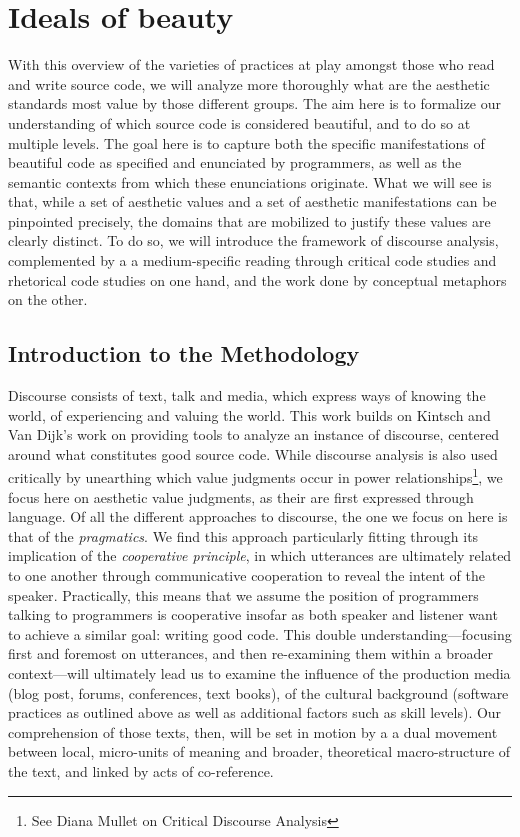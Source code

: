 \pagebreak

\section{Ideals of beauty} %

With this overview of the varieties of practices at play amongst those who read and write source code, we will analyze more thoroughly what are the aesthetic standards most value by those different groups. The aim here is to formalize our understanding of which source code is considered beautiful, and to do so at multiple levels. The goal here is to capture both the specific manifestations of beautiful code as specified and enunciated by programmers, as well as the semantic contexts from which these enunciations originate. What we will see is that, while a set of aesthetic values and a set of aesthetic manifestations can be pinpointed precisely, the domains that are mobilized to justify these values are clearly distinct. To do so, we will introduce the framework of discourse analysis, complemented by a a medium-specific reading through critical code studies and rhetorical code studies on one hand, and the work done by conceptual metaphors on the other.

\subsection{Introduction to the Methodology} %

Discourse consists of text, talk and media, which express ways of knowing the world, of experiencing and valuing the world. This work builds on Kintsch and Van Dijk's work on providing tools to analyze an instance of discourse, centered around what constitutes good source code. While discourse analysis is also used critically by unearthing which value judgments occur in power relationships\footnote{See Diana Mullet on Critical Discourse Analysis\cite{mullet_general_2018a}}, we focus here on aesthetic value judgments, as their are first expressed through language. Of all the different approaches to discourse, the one we focus on here is that of the \emph{pragmatics}. We find this approach particularly fitting through its implication of the \emph{cooperative principle}, in which utterances are ultimately related to one another through communicative cooperation to reveal the intent of the speaker\cite{schiffrin_approaches_1994}. Practically, this means that we assume the position of programmers talking to programmers is cooperative insofar as both speaker and listener want to achieve a similar goal: writing good code. This double understanding—focusing first and foremost on utterances, and then re-examining them within a broader context—will ultimately lead us to examine the influence of  the production media (blog post, forums, conferences, text books), of the cultural background (software practices as outlined above as well as additional factors such as skill levels). Our comprehension of those texts, then, will be set in motion by a a dual movement between local, micro-units of meaning and broader, theoretical macro-structure of the text, and linked by acts of co-reference\cite{kintsch_model_1978}.

